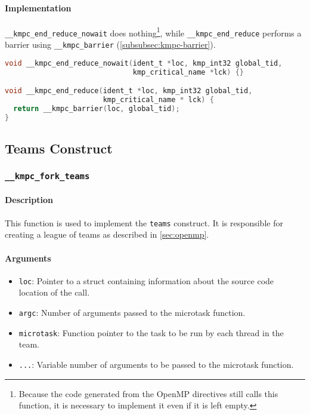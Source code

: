 \paragraph{Implementation} \texttt{\_\_kmpc\_end\_reduce\_nowait} does nothing\footnote{Because the
	code generated from the OpenMP directives still calls this function, it is necessary to implement it
	even if it is left empty.}, while \texttt{\_\_kmpc\_end\_reduce} performs a barrier using
\texttt{\_\_kmpc\_barrier} (\cref{subsubsec:kmpc-barrier}).

\begin{lstlisting}[language=C, caption={__kmpc_end_reduce and __kmpc_end_reduce_nowait},
                   label={lst:kmpc-end-reduce}, escapechar=@]
void __kmpc_end_reduce_nowait(ident_t *loc, kmp_int32 global_tid,
                              kmp_critical_name *lck) {}

void __kmpc_end_reduce(ident_t *loc, kmp_int32 global_tid,
                       kmp_critical_name * lck) {
  return __kmpc_barrier(loc, global_tid);
}
\end{lstlisting}

\subsection{Teams Construct}

\subsubsection{\texttt{__kmpc_fork_teams}}
\label{subsubsec:kmpc-fork-teams}

\paragraph{Description} This function is used to implement the \texttt{teams} construct. It is
responsible for creating a league of teams as described in \cref{sec:openmp}.

\paragraph{Arguments}
\begin{itemize}
	\item \texttt{loc}: Pointer to a struct containing information about the source code location
	      of the call.
	\item \texttt{argc}: Number of arguments passed to the microtask function.
	\item \texttt{microtask}: Function pointer to the task to be run by each thread in the team.
	\item \texttt{...}: Variable number of arguments to be passed to the microtask function.
\end{itemize}

